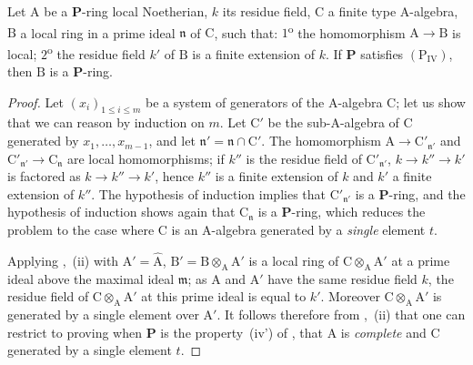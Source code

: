 \begin{lemma}[7.4.4.1]
\label{IV.7.4.4.1}
Let $\mathrm{A}$ be a $\boldsymbol{P}$-ring local Noetherian, $k$ its residue field, $\mathrm{C}$ a finite type A-algebra, $\mathrm{B}$ a local ring in a prime ideal $\mathfrak{n}$ of $\mathrm{C}$, such that:
$1$\textsuperscript{o} the homomorphism $\mathrm{A}\to\mathrm{B}$ is local; $2$\textsuperscript{o} the residue field $k'$ of $\mathrm{B}$ is a finite extension of $k$.
If $\boldsymbol{P}$ satisfies $(\mathrm{P_{IV}})$, then $\mathrm{B}$ is a $\boldsymbol{P}$-ring.
\end{lemma}

\begin{proof}
Let $(x_i)_{1\leqslant i\leqslant m}$ be a system of generators of the A-algebra $\mathrm{C}$; let us show that we can reason by induction on $m$.
Let $\mathrm{C}'$ be the sub-A-algebra of $\mathrm{C}$ generated by $x_1,\ldots,x_{m-1}$, and let $\mathfrak{n}'=\mathfrak{n}\cap\mathrm{C}'$.
The homomorphism $\mathrm{A}\to\mathrm{C}'_{\mathfrak{n}'}$ and $\mathrm{C}'_{\mathfrak{n}'}\to\mathrm{C}_\mathfrak{n}$ are local homomorphisms; if $k''$ is the residue field of $\mathrm{C}'_{\mathfrak{n}'}$, $k\to k''\to k'$ is factored as $k\to k''\to k'$, hence $k''$ is a finite extension of $k$ and $k'$ a finite extension of $k''$.
The hypothesis of induction implies that $\mathrm{C}'_{\mathfrak{n}'}$ is a $\boldsymbol{P}$-ring, and the hypothesis of induction shows again that $\mathrm{C}_\mathfrak{n}$ is a $\boldsymbol{P}$-ring, which reduces the problem to the case where $\mathrm{C}$ is an A-algebra generated by a \emph{single} element $t$.

Applying ,~(ii) with $\mathrm{A}'=\widehat{\mathrm{A}}$, $\mathrm{B}'=\mathrm{B}\otimes_\mathrm{A}\mathrm{A}'$ is a local ring of $\mathrm{C}\otimes_\mathrm{A}\mathrm{A}'$ at a prime ideal above the maximal ideal $\mathfrak{m}$; as $\mathrm{A}$ and $\mathrm{A}'$ have the same residue field $k$, the residue field of $\mathrm{C}\otimes_\mathrm{A}\mathrm{A}'$ at this prime ideal is equal to $k'$.
Moreover $\mathrm{C}\otimes_\mathrm{A}\mathrm{A}'$ is generated by a single element over $\mathrm{A}'$.
It follows therefore from ,~(ii) that one can restrict to proving  when $\boldsymbol{P}$ is the property~(iv') of , that $\mathrm{A}$ is \emph{complete} and $\mathrm{C}$ generated by a single element $t$.


\end{proof}
